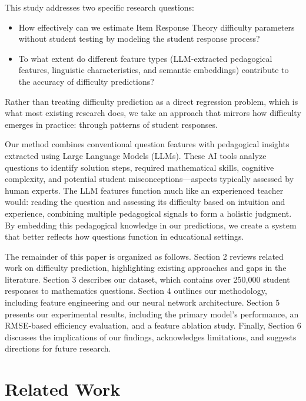 \documentclass[
    a4paper, %
    10pt, %
    twoside, %
]{LTJournalArticle}
\begin{document}
This study addresses two specific research questions:
\begin{itemize}
    \item How effectively can we estimate Item Response Theory difficulty parameters without student testing by modeling the student response process?
    \item To what extent do different feature types (LLM-extracted pedagogical features, linguistic characteristics, and semantic embeddings) contribute to the accuracy of difficulty predictions?
\end{itemize}

Rather than treating difficulty prediction as a direct regression problem, which is what most existing research does, we take an approach that mirrors how difficulty emerges in practice: through patterns of student responses.

Our method combines conventional question features with pedagogical insights extracted using Large Language Models (LLMs). These AI tools analyze questions to identify solution steps, required mathematical skills, cognitive complexity, and potential student misconceptions—aspects typically assessed by human experts. The LLM features function much like an experienced teacher would: reading the question and assessing its difficulty based on intuition and experience, combining multiple pedagogical signals to form a holistic judgment. By embedding this pedagogical knowledge in our predictions, we create a system that better reflects how questions function in educational settings.

The remainder of this paper is organized as follows. Section 2 reviews related work on difficulty prediction, highlighting existing approaches and gaps in the literature. Section 3 describes our dataset, which contains over 250,000 student responses to mathematics questions. Section 4 outlines our methodology, including feature engineering and our neural network architecture. Section 5 presents our experimental results, including the primary model's performance, an RMSE-based efficiency evaluation, and a feature ablation study. Finally, Section 6 discusses the implications of our findings, acknowledges limitations, and suggests directions for future research.

\section{Related Work}
\end{document}
